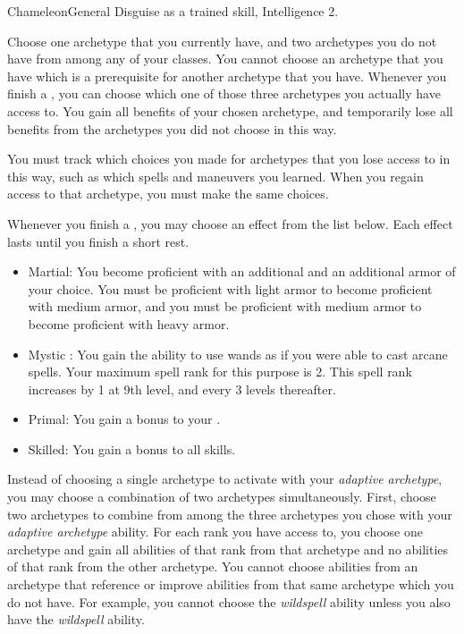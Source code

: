   \begin{feat}{Chameleon}{General}
    \featpre Disguise as a trained skill, Intelligence 2.

     Choose one archetype that you currently have, and two archetypes you do not have from among any of your classes.
    You cannot choose an archetype that you have which is a prerequisite for another archetype that you have.
    Whenever you finish a , you can choose which one of those three archetypes you actually have access to.
    You gain all benefits of your chosen archetype, and temporarily lose all benefits from the archetypes you did not choose in this way.

    You must track which choices you made for archetypes that you lose access to in this way, such as which spells and maneuvers you learned.
    When you regain access to that archetype, you must make the same choices.

     Whenever you finish a , you may choose an effect from the list below.
    Each effect lasts until you finish a short rest.
    \begin{itemize}
      \item Martial: You become proficient with an additional  and an additional armor  of your choice.
        You must be proficient with light armor to become proficient with medium armor, and you must be proficient with medium armor to become proficient with heavy armor.
      \item Mystic \sparkle: You gain the ability to use wands as if you were able to cast arcane spells.
        Your maximum spell rank for this purpose is 2.
        This spell rank increases by 1 at 9th level, and every 3 levels thereafter.
      \item Primal: You gain a  bonus to your .
      \item Skilled: You gain a  bonus to all skills.
    \end{itemize}

     Instead of choosing a single archetype to activate with your \textit{adaptive archetype}, you may choose a combination of two archetypes simultaneously.
    First, choose two archetypes to combine from among the three archetypes you chose with your \textit{adaptive archetype} ability.
    For each rank you have access to, you choose one archetype and gain all abilities of that rank from that archetype and no abilities of that rank from the other archetype.
    You cannot choose abilities from an archetype that reference or improve abilities from that same archetype which you do not have.
    For example, you cannot choose the \textit{wildspell\plus} ability unless you also have the \textit{wildspell} ability.


\end{feat}
